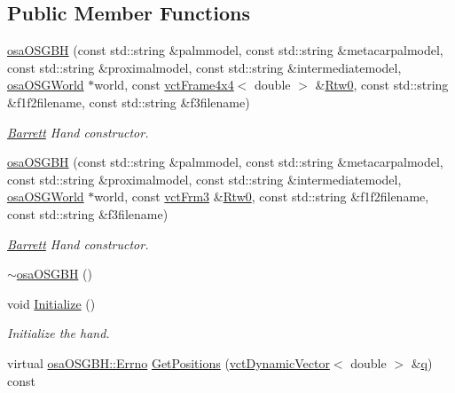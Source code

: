 \subsection*{Public Member Functions}
\begin{DoxyCompactItemize}
\item 
\hyperlink{classosa_o_s_g_b_h_a4508c7bf1b6257c84c0486f4ef3e757a}{osa\-O\-S\-G\-B\-H} (const std\-::string \&palmmodel, const std\-::string \&metacarpalmodel, const std\-::string \&proximalmodel, const std\-::string \&intermediatemodel, \hyperlink{classosa_o_s_g_world}{osa\-O\-S\-G\-World} $\ast$world, const \hyperlink{classvct_frame4x4}{vct\-Frame4x4}$<$ double $>$ \&\hyperlink{classrob_manipulator_ab48d9d9a166bf252698bc35788ca6ad6}{Rtw0}, const std\-::string \&f1f2filename, const std\-::string \&f3filename)
\begin{DoxyCompactList}\small\item\em \hyperlink{struct_barrett}{Barrett} Hand constructor. \end{DoxyCompactList}\item 
\hyperlink{classosa_o_s_g_b_h_af4458de175613dbaca339a38fd884365}{osa\-O\-S\-G\-B\-H} (const std\-::string \&palmmodel, const std\-::string \&metacarpalmodel, const std\-::string \&proximalmodel, const std\-::string \&intermediatemodel, \hyperlink{classosa_o_s_g_world}{osa\-O\-S\-G\-World} $\ast$world, const \hyperlink{vct_transformation_types_8h_a81feda0a02c2d1bc26e5553f409fed20}{vct\-Frm3} \&\hyperlink{classrob_manipulator_ab48d9d9a166bf252698bc35788ca6ad6}{Rtw0}, const std\-::string \&f1f2filename, const std\-::string \&f3filename)
\begin{DoxyCompactList}\small\item\em \hyperlink{struct_barrett}{Barrett} Hand constructor. \end{DoxyCompactList}\item 
\hyperlink{classosa_o_s_g_b_h_ac54caffaf85727506bb140f6cb2e401a}{$\sim$osa\-O\-S\-G\-B\-H} ()
\item 
void \hyperlink{classosa_o_s_g_b_h_a2955c266753c3f514f728aa76832aaf1}{Initialize} ()
\begin{DoxyCompactList}\small\item\em Initialize the hand. \end{DoxyCompactList}\item 
virtual \hyperlink{classrob_manipulator_a7bbb51cdb81c9c681075a9274ca0cdc0}{osa\-O\-S\-G\-B\-H\-::\-Errno} \hyperlink{classosa_o_s_g_b_h_adc2f5a393d13e909ee1f04bd1195e9dd}{Get\-Positions} (\hyperlink{classvct_dynamic_vector}{vct\-Dynamic\-Vector}$<$ double $>$ \&\hyperlink{classosa_o_s_g_manipulator_a834ce7263dace4d925133753522abaa3}{q}) const 

\end{DoxyCompactItemize}

